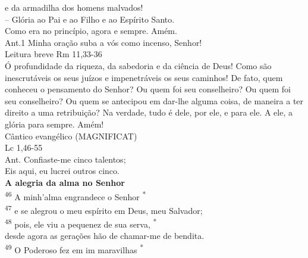 \documentclass{book}
\begin{document}
\begin{center}
    e da armadilha dos homens malvados!
    \vspace{.2cm} \\
    -- Glória ao Pai e ao Filho e ao Espírito Santo. \\
    Como era no princípio, agora e sempre. Amém.
    \vspace{.2cm} \\
    \textcolor{VioletRed1}{Ant.1} Minha oração suba a vós como incenso, Senhor!
    \vspace{.2cm} \\
    \textcolor{VioletRed1}{Leitura breve Rm 11,33-36}
    \vspace{.2cm} \\
    Ó profundidade da riqueza, da sabedoria e da ciência de Deus! Como são inescrutáveis os seus juízos e impenetráveis os seus caminhos! De fato, quem conheceu o pensamento do Senhor? Ou quem foi seu conselheiro? Ou quem foi seu conselheiro? Ou quem se antecipou em dar-lhe alguma coisa, de maneira a ter direito a uma retribuição? Na verdade, tudo é dele, por ele, e para ele. A ele, a glória para sempre. Amém!
    \vspace{.2cm} \\
    \textcolor{VioletRed1}{Cântico evangélico (MAGNIFICAT) \\ Lc 1,46-55}
    \vspace{.2cm} \\
    \textcolor{VioletRed1}{Ant.} Confiaste-me cinco talentos; \\
    Eis aqui, eu lucrei outros cinco.
    \vspace{.2cm} \\
    \textbf{A alegria da alma no Senhor}
    \vspace{.2cm} \\
    \textsuperscript{\underline{\hspace{.07in}}\textcolor{VioletRed1}{46}} A minh'alma engrandece o Senhor \textsuperscript{*} \\
    \textsuperscript{\textcolor{VioletRed1}{47}} e se alegrou o meu espírito em Deus, meu Salvador; \\
    \textsuperscript{\underline{\hspace{.07in}}\textcolor{VioletRed1}{48}} pois, ele viu a pequenez de sua serva, \textsuperscript{*}\\
    desde agora as gerações hão de chamar-me de bendita.
    \vspace{.2cm} \\
    \textsuperscript{\underline{\hspace{.07in}}\textcolor{VioletRed1}{49}} O Poderoso fez em im maravilhas \textsuperscript{*} \\

\end{center}
\end{document}
